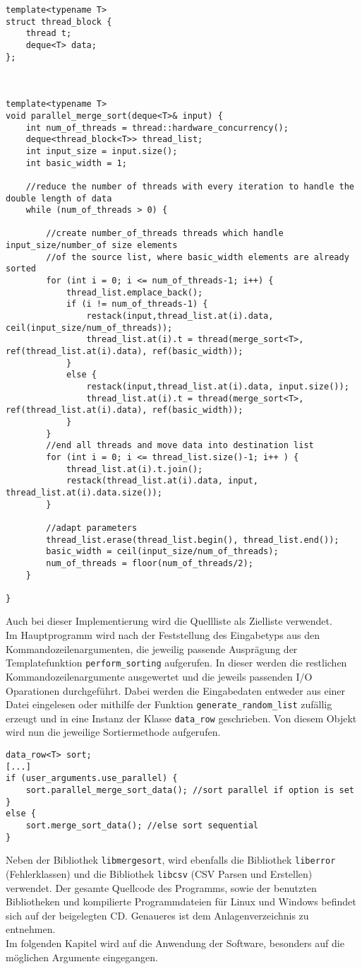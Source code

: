 \begin{lstlisting}
template<typename T>
struct thread_block {
	thread t;
	deque<T> data;
};



template<typename T>
void parallel_merge_sort(deque<T>& input) {
	int num_of_threads = thread::hardware_concurrency();
	deque<thread_block<T>> thread_list;
	int input_size = input.size();
	int basic_width = 1;

	//reduce the number of threads with every iteration to handle the double length of data
	while (num_of_threads > 0) {

		//create number_of_threads threads which handle input_size/number_of size elements
		//of the source list, where basic_width elements are already sorted
		for (int i = 0; i <= num_of_threads-1; i++) {
			thread_list.emplace_back();
			if (i != num_of_threads-1) {
				restack(input,thread_list.at(i).data, ceil(input_size/num_of_threads));
				thread_list.at(i).t = thread(merge_sort<T>, ref(thread_list.at(i).data), ref(basic_width));
			}
			else {
				restack(input,thread_list.at(i).data, input.size());
				thread_list.at(i).t = thread(merge_sort<T>, ref(thread_list.at(i).data), ref(basic_width));
			}
		}
		//end all threads and move data into destination list
		for (int i = 0; i <= thread_list.size()-1; i++ ) {
			thread_list.at(i).t.join();
			restack(thread_list.at(i).data, input, thread_list.at(i).data.size());
		}

		//adapt parameters
		thread_list.erase(thread_list.begin(), thread_list.end());
		basic_width = ceil(input_size/num_of_threads);
		num_of_threads = floor(num_of_threads/2);
	}

}
\end{lstlisting}
Auch bei dieser Implementierung wird die Quellliste als Zielliste verwendet.\\[0.25 cm]
Im Hauptprogramm wird nach der Feststellung des Eingabetyps aus den Kommandozeilenargumenten, die jeweilig passende Ausprägung der Templatefunktion \texttt{perform\_sorting} aufgerufen. In dieser werden die restlichen Kommandozeilenargumente ausgewertet und die jeweils passenden \ac{I/O} Oparationen durchgeführt. Dabei werden die Eingabedaten entweder aus einer Datei eingelesen oder mithilfe der Funktion \texttt{generate\_random\_list} zufällig erzeugt und in eine Instanz der Klasse \texttt{data\_row} geschrieben. Von diesem Objekt wird nun die jeweilige Sortiermethode aufgerufen.
\begin{lstlisting}
data_row<T> sort;
[...]
if (user_arguments.use_parallel) {
	sort.parallel_merge_sort_data(); //sort parallel if option is set
}
else {
	sort.merge_sort_data(); //else sort sequential
}
\end{lstlisting}
Neben der Bibliothek \texttt{libmergesort}, wird ebenfalls die Bibliothek \texttt{liberror} (Fehlerklassen) und die Bibliothek \texttt{libcsv} (\ac{CSV} Parsen und Erstellen) verwendet.
Der gesamte Quellcode des Programms, sowie der benutzten Bibliotheken und kompilierte Programmdateien für Linux und Windows befindet sich auf der beigelegten CD. Genaueres ist dem Anlagenverzeichnis zu entnehmen.\\[0.25 cm]
Im folgenden Kapitel wird auf die Anwendung der Software, besonders auf die möglichen Argumente eingegangen.

